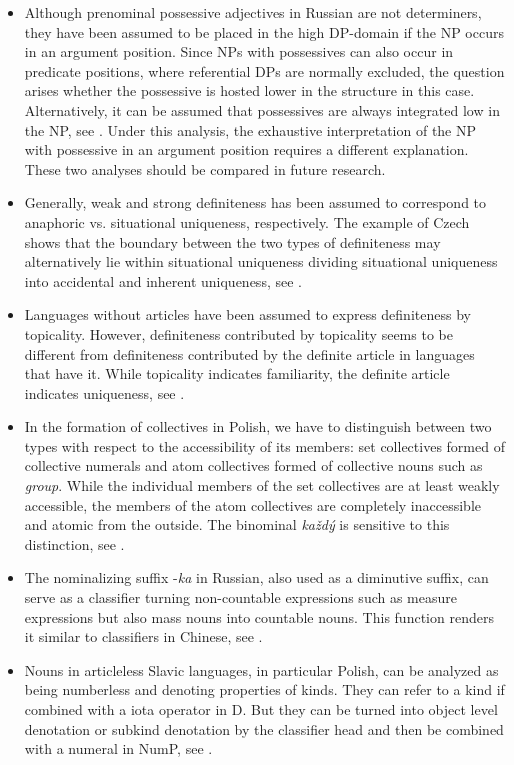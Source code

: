 \documentclass[output=paper,
colorlinks,
citecolor=brown,
newtxmath
]{langscibook}
\begin{document}
\begin{itemize}
    \item Although prenominal possessive adjectives in Russian are not determiners, they have been assumed to be placed in the high DP-domain if the NP occurs in an argument position. Since NPs with possessives can also occur in predicate positions, where referential DPs are normally excluded, the question arises whether the possessive is hosted lower in the structure in this case. Alternatively, it can be assumed that possessives are always integrated low in the NP, see . Under this analysis, the exhaustive interpretation of the NP with possessive in an argument position requires a different explanation. These two analyses should be compared in future research.
    \item Generally, weak and strong definiteness has been assumed to correspond to anaphoric vs. situational uniqueness, respectively. The example of Czech shows that the boundary between the two types of definiteness may alternatively lie within situational uniqueness dividing situational uniqueness into accidental and inherent uniqueness, see .
    \item Languages without articles have been assumed to express definiteness by topicality. However, definiteness contributed by topicality seems to be different from definiteness contributed by the definite article in languages that have it. While topicality indicates familiarity, the definite article indicates uniqueness, see  .
    \item In the formation of collectives in Polish, we have to distinguish between two types with respect to the accessibility of its members: set collectives formed of collective numerals and atom collectives formed of collective nouns such as \textit{group}. While the individual members of the set collectives are at least weakly accessible, the members of the atom collectives are completely inaccessible and atomic from the outside. The binominal \textit{každý} is sensitive to this distinction, see .
    \item The nominalizing suffix -\textit{ka} in Russian, also used as a diminutive suffix, can serve as a classifier turning non-countable expressions such as measure expressions but also mass nouns into countable nouns. This function renders it similar to classifiers in Chinese, see .
    \item Nouns in articleless Slavic languages, in particular Polish, can be analyzed as being numberless and denoting properties of kinds. They can refer to a kind if combined with a iota operator in D. But they can be turned into object level denotation or subkind denotation by the classifier head and then be combined with a numeral in NumP, see .
\end{itemize}
\end{document}
